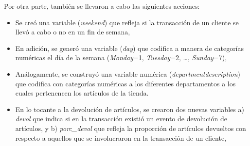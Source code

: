 \documentclass[]{book}
\providecommand{\tightlist}{%
  \setlength{\itemsep}{0pt}\setlength{\parskip}{0pt}}
\begin{document}
Por otra parte, también se llevaron a cabo las siguientes acciones:

\begin{itemize}
\tightlist
\item
  Se creó una variable (\emph{weekend}) que refleja si la transacción de un cliente se llevó a cabo o no en un fin de semana,
\item
  En adición, se generó una variable (\emph{day}) que codifica a manera de categorías numéricas el día de la semana (\emph{Monday}=1, \emph{Tuesday}=2, \ldots{}, \emph{Sunday}=7),
\item
  Análogamente, se construyó una variable numérica (\emph{departmentdescription}) que codifica con categorías numéricas a los diferentes departamentos a los cuales pertenencen los artículos de la tienda.
\item
  En lo tocante a la devolución de artículos, se crearon dos nuevas variables a) \emph{devol} que indica si en la transacción existió un evento de devolución de artículos, y b) \emph{porc\_devol} que refleja la proporción de artículos devueltos con respecto a aquellos que se involucraron en la transacción de un cliente,
\end{itemize}


\end{document}
